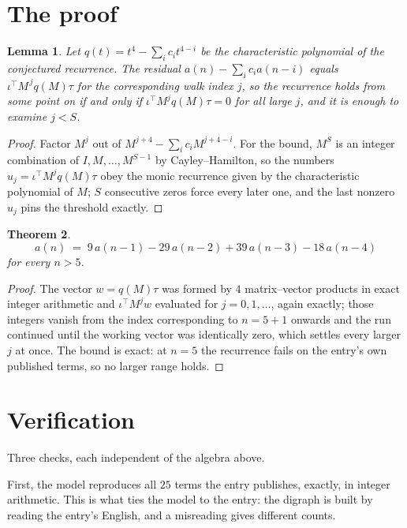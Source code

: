 \documentclass[11pt,a4paper]{article}
\theoremstyle{plain}
\newtheorem{theorem}{Theorem}
\newtheorem{lemma}[theorem]{Lemma}
\theoremstyle{definition}
\begin{document}
\section{The proof}

\begin{lemma}\label{lem:crit}
Let $q(t)=t^{4}-\sum_i c_it^{4-i}$ be the characteristic polynomial of the
conjectured recurrence. The residual $a(n)-\sum_ic_ia(n-i)$ equals
$\iota^{\!\top}M^{\,j}q(M)\tau$ for the corresponding walk index $j$, so the recurrence
holds from some point on if and only if $\iota^{\!\top}M^{j}q(M)\tau=0$ for all large $j$,
and it is enough to examine $j<S$.
\end{lemma}

\begin{proof}
Factor $M^{j}$ out of $M^{j+4}-\sum_ic_iM^{j+4-i}$. For the bound, $M^{S}$
is an integer combination of $I,M,\dots,M^{S-1}$ by Cayley--Hamilton, so the numbers
$u_j=\iota^{\!\top}M^{j}q(M)\tau$ obey the monic recurrence given by the characteristic
polynomial of $M$; $S$ consecutive zeros force every later one, and the last nonzero $u_j$
pins the threshold exactly.
\end{proof}

\begin{theorem}
\[
a(n)\;=\;9\,a(n-1) - 29\,a(n-2) + 39\,a(n-3) - 18\,a(n-4)
\]
for every $n>5$.
\end{theorem}

\begin{proof}
The vector $w=q(M)\tau$ was formed by $4$ matrix--vector products in exact integer
arithmetic and $\iota^{\!\top}M^{j}w$ evaluated for $j=0,1,\dots$, again exactly; those
integers vanish from the index corresponding to $n=5+1$ onwards and the run continued
until the working vector was identically zero, which settles every larger $j$ at once. The bound is exact: at $n=5$ the recurrence fails on the entry's own published terms, so no larger range holds.
\end{proof}

\section{Verification}

Three checks, each independent of the algebra above.

First, the model reproduces all $25$ terms the entry publishes, exactly, in integer
arithmetic. This is what ties the model to the entry: the digraph is built by reading the
entry's English, and a misreading gives different counts.
\end{document}
